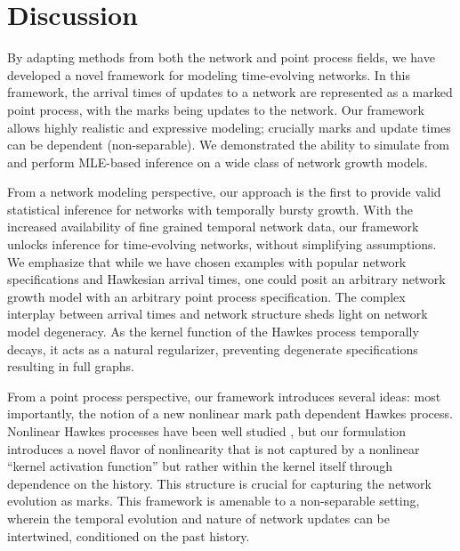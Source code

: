 \documentclass[12pt]{article}
\begin{document}









\section{Discussion}\label{sec:discuss}

By adapting methods from both the network and point process fields, we have developed a novel framework for modeling time-evolving networks.  In this framework, the arrival times of updates to a network are represented as a marked point process, with the marks being updates to the network. Our framework allows highly realistic and expressive modeling; crucially marks and update times can be dependent (non-separable). 
We demonstrated the ability to simulate from and perform MLE-based inference on a wide class of network growth models. 

From a network modeling perspective, our approach is the first to provide valid statistical inference for networks with temporally bursty growth. With the increased availability of fine grained temporal network data, our framework unlocks inference for time-evolving networks, without simplifying assumptions. We emphasize that while we have chosen examples with popular network specifications and Hawkesian arrival times, one could posit an arbitrary network growth model with an arbitrary point process specification. The complex interplay between arrival times and network structure sheds light on network model degeneracy. As the kernel function of the Hawkes process temporally decays, it acts as a natural regularizer, preventing degenerate specifications resulting in full graphs. 

From a point process perspective, our framework introduces several ideas: most importantly, the notion of a new nonlinear mark path dependent Hawkes process. Nonlinear Hawkes processes have been well studied \citep{bremaud1996stability}, but our formulation introduces a novel flavor of nonlinearity that is not captured by a nonlinear ``kernel activation function'' but rather within the kernel itself through dependence on the history. This structure is crucial for capturing the network evolution as marks. This framework is amenable to a non-separable setting, wherein the temporal evolution and nature of network updates can be intertwined, conditioned on the past history.
\end{document}
